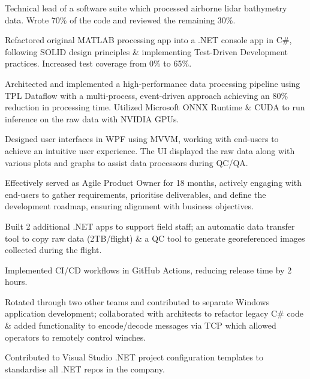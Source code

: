\documentclass[10pt,letterpaper]{article}
\begin{document}
    \begin{itemize*}
    \vspace{-0.5em}
    \item Technical lead of a software suite which processed airborne lidar bathymetry data. Wrote 70\% of the code and reviewed the remaining 30\%. 
    \item {}
    \item Refactored original MATLAB processing app into a .NET console app in C\#, following SOLID design principles \& implementing Test-Driven Development practices. Increased test coverage from 0\% to 65\%.
    \item Architected and implemented a high-performance data processing pipeline using TPL Dataflow with a multi-process, event-driven approach achieving an 80\% reduction in processing time. Utilized Microsoft ONNX Runtime \& CUDA to run inference on the raw data with NVIDIA GPUs.
    \item Designed user interfaces in WPF using MVVM, working with end-users to achieve an intuitive user experience. The UI displayed the raw data along with various plots and graphs to assist data processors during QC/QA.
    \item Effectively served as Agile Product Owner for 18 months, actively engaging with end-users to gather requirements, prioritise deliverables, and define the development roadmap, ensuring alignment with business objectives. 
    \item Built 2 additional .NET apps to support field staff; an automatic data transfer tool to copy raw data (2TB/flight) \& a QC tool to generate georeferenced images collected during the flight.
    \item Implemented CI/CD workflows in GitHub Actions, reducing release time by 2 hours.
    \item Rotated through two other teams and contributed to separate Windows application development; collaborated with architects to refactor legacy C\# code \& added functionality to encode/decode messages via TCP which allowed operators to remotely control winches. 
    \item Contributed to Visual Studio .NET project configuration templates to standardise all .NET repos in the company.
    \item {}
    \end{itemize*}
\end{document}
